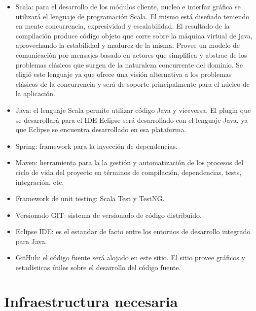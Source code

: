 \documentclass[12pt,a4paper]{article}
\begin{document}
	\begin{itemize}
	
	\item Scala: para el desarrollo de los módulos cliente, nucleo e interfaz gráfica se utilizará el lenguaje de programación Scala. El mismo está diseñado teniendo en mente concurrencia, expresividad y escalabilidad. El resultado de la compilación produce código objeto que corre sobre la máquina virtual de java, aprovechando la estabilidad y madurez de la misma. Provee un modelo de comunicación por mensajes basado en actores que simplifica y abstrae de los problemas clásicos que surgen de la naturaleza concurrente del dominio.
Se eligió este lenguaje ya que ofrece una visión alternativa a los problemas clásicos de la concurrencia y será de soporte principalmente para el núcleo de la aplicación.

	\item Java: el lenguaje Scala permite utilizar código Java y viceversa. El plugin que se desarrollará para el IDE Eclipse será desarrollado con el lenguaje Java, ya que Eclipse se encuentra desarrollado en esa plataforma.

	\item Spring: framework para la inyección de dependencias.

	\item Maven: herramienta para la la gestión y automatización de los procesos del ciclo de vida del proyecto en términos de compilación, dependencias, tests, integración, etc.

	\item Framework de unit testing: Scala Test y TestNG.

	\item Versionado GIT: sistema de versionado de código distribuído.

	\item Eclipse IDE: es el estandar de facto entre los entornos de desarrollo integrado para Java.

	\item GitHub: el código fuente será alojado en este sitio. El sitio provee gráficos y estadísticas útiles sobre el desarrollo del código fuente.	

	\end{itemize}

	
	\section{Infraestructura necesaria}
\end{document}
